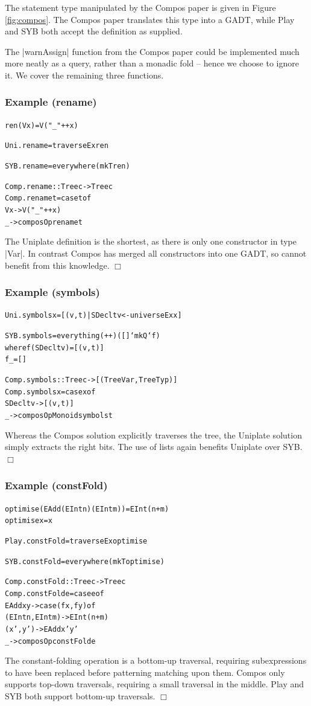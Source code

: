 \documentclass[preprint]{sigplanconf}
\newcommand{\noexample}{\hfill$\Box$}
\newenvironment{code}{\begin{alltt}\small}{\end{alltt}}
\newenvironment{examplename}[1]{\subsubsection*{Example (#1)}}{\noexample}
\begin{document}
The statement type manipulated by the Compos paper is given in Figure \ref{fig:compos}. The Compos paper translates this type into a GADT, while Play and SYB both accept the definition as supplied.

The |warnAssign| function from the Compos paper could be implemented much more neatly as a query, rather than a monadic fold -- hence we choose to ignore it. We cover the remaining three functions.

\begin{examplename}{rename}

\begin{code}
ren (V x) = V ("_" ++ x)

Uni.rename = traverseEx ren

SYB.rename = everywhere (mkT ren)

Comp.rename :: Tree c -> Tree c
Comp.rename t = case t of
    V x -> V ("_" ++ x)
    _   -> composOp rename t
\end{code}

The Uniplate definition is the shortest, as there is only one constructor in type |Var|. In contrast Compos has merged all constructors into one GADT, so cannot benefit from this knowledge.
\end{examplename}

\begin{examplename}{symbols}

\begin{code}
Uni.symbols x = [(v,t) | SDecl t v <- universeEx x]

SYB.symbols = everything (++) ([] `mkQ` f)
    where  f (SDecl t v)  = [(v,t)]
           f _            = []

Comp.symbols :: Tree c -> [(Tree Var, Tree Typ)]
Comp.symbols x = case x of
    SDecl t v -> [(v,t)]
    _ -> composOpMonoid symbols t
\end{code}

Whereas the Compos solution explicitly traverses the tree, the Uniplate solution simply extracts the right bits. The use of lists again benefits Uniplate over SYB.
\end{examplename}

\begin{examplename}{constFold}

\begin{code}
optimise (EAdd (EInt n) (EInt m)) = EInt (n+m)
optimise x = x

Play.constFold = traverseEx optimise

SYB.constFold = everywhere (mkT optimise)

Comp.constFold :: Tree c -> Tree c
Comp.constFold e = case e of
    EAdd x y -> case  (f x, f y) of
                      (EInt n, EInt m) -> EInt (n+m)
                      (x',y') -> EAdd x' y'
    _ -> composOp constFold e
\end{code}

The constant-folding operation is a bottom-up traversal, requiring subexpressions to have been replaced before patterning matching upon them. Compos only supports top-down traversals, requiring a small traversal in the middle. Play and SYB both support bottom-up traversals.
\end{examplename}
\end{document}
